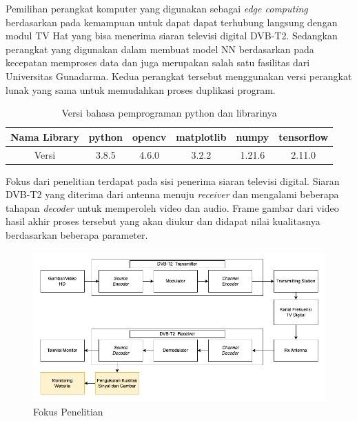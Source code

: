 Pemilihan perangkat komputer yang digunakan sebagai \textit{edge computing} berdasarkan pada kemampuan untuk dapat dapat terhubung langsung dengan modul TV Hat yang bisa menerima siaran televisi digital DVB-T2. Sedangkan perangkat yang digunakan dalam membuat model NN berdasarkan pada kecepatan memproses data dan juga merupakan salah satu fasilitas dari Universitas Gunadarma. Kedua perangkat tersebut menggunakan versi perangkat lunak yang sama untuk memudahkan proses duplikasi program.

\begin{table}[H]
	\centering
	\caption{Versi bahasa pemprograman python dan librarinya}
	\label{tabel-spek-sw}
	\begin{tabular}{|c|c|c|c|c|c|}
		\hline
		Nama Library & python & opencv & matplotlib & numpy  & tensorflow \\ \hline
		Versi        & 3.8.5  & 4.6.0  & 3.2.2      & 1.21.6 & 2.11.0     \\ \hline
	\end{tabular}
\end{table}

Fokus dari penelitian terdapat pada sisi penerima siaran televisi digital. Siaran DVB-T2 yang diterima dari antenna menuju \textit{receiver} dan mengalami beberapa tahapan \textit{decoder} untuk memperoleh video dan audio. Frame gambar dari video hasil akhir proses tersebut yang akan diukur dan didapat nilai kualitasnya berdasarkan beberapa parameter.

\begin{figure}[H]
	\vspace{-0.1cm}
	\begin{center}
		\includegraphics[width=1\columnwidth]{bab3/Gambar/fokus-penelitian.png}
	\end{center}
	\vspace{-0.2cm}
	\caption{Fokus Penelitian} \label{fokus-penelitian}
\end{figure}

